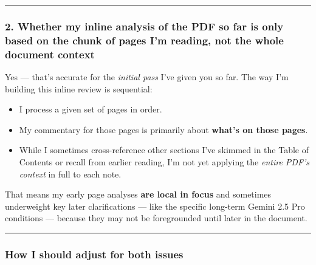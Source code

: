 \documentclass{article}
\begin{document}
\begin{center}\rule{0.5\linewidth}{0.5pt}\end{center}

\subsubsection*{\texorpdfstring{\textbf{2. Whether my inline analysis of the PDF so far is only based on the chunk of pages I'm reading, not the whole document context}}{2. Whether my inline analysis of the PDF so far is only based on the chunk of pages I'm reading, not the whole document context}}\label{whether-my-inline-analysis-of-the-pdf-so-far-is-only-based-on-the-chunk-of-pages-im-reading-not-the-whole-document-context}

Yes --- that's accurate for the \emph{initial pass} I've given you so far. The way I'm building this inline review is sequential:

\begin{itemize}
\item
  I process a given set of pages in order.
\item
  My commentary for those pages is primarily about \textbf{what's on those pages}.
\item
  While I sometimes cross-reference other sections I've skimmed in the Table of Contents or recall from earlier reading, I'm not yet applying the \emph{entire PDF's context} in full to each note.
\end{itemize}

That means my early page analyses \textbf{are local in focus} and sometimes underweight key later clarifications --- like the specific long-term Gemini 2.5 Pro conditions --- because they may not be foregrounded until later in the document.

\begin{center}\rule{0.5\linewidth}{0.5pt}\end{center}

\subsubsection*{\texorpdfstring{\textbf{How I should adjust for both issues}}{How I should adjust for both issues}}\label{how-i-should-adjust-for-both-issues}
\end{document}
